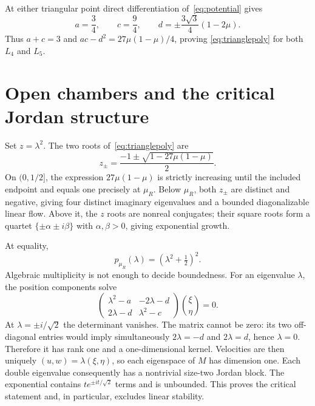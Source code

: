 \documentclass[10pt]{article}
\begin{document}
At either triangular point direct differentiation of~\eqref{eq:potential}
gives
\begin{equation}\label{eq:trihess}
 a=\frac34,\qquad c=\frac94,\qquad
 d=\mathord\pm\frac{3\sqrt3}{4}(1-2\mu).
\end{equation}
Thus $a+c=3$ and $ac-d^2=27\mu(1-\mu)/4$, proving
\eqref{eq:trianglepoly} for both $L_4$ and $L_5$.

\section{Open chambers and the critical Jordan structure}
Set $z=\lambda^2$.  The two roots of~\eqref{eq:trianglepoly} are
\begin{equation}\label{eq:zroots}
 z_\pm=\frac{-1\pm\sqrt{1-27\mu(1-\mu)}}{2}.
\end{equation}
On $(0,1/2]$, the expression $27\mu(1-\mu)$ is strictly increasing until
the included endpoint and equals one precisely at $\mu_R$.  Below $\mu_R$,
both $z_\pm$ are distinct and negative, giving four distinct imaginary
eigenvalues and a bounded diagonalizable linear flow.  Above it, the $z$
roots are nonreal conjugates; their square roots form a quartet
$\{\pm\alpha\pm i\beta\}$ with $\alpha,\beta>0$, giving exponential growth.

At equality,
\begin{equation}\label{eq:criticalpoly}
 p_{\mu_R}(\lambda)=(\lambda^2+\tfrac12)^2.
\end{equation}
Algebraic multiplicity is not enough to decide boundedness.  For an
eigenvalue $\lambda$, the position components solve
\begin{equation}\label{eq:pencil}
 \begin{pmatrix}
 \lambda^2-a&-2\lambda-d\\2\lambda-d&\lambda^2-c
 \end{pmatrix}\binom{\xi}{\eta}=0.
\end{equation}
At $\lambda=\pm i/\sqrt2$ the determinant vanishes.  The matrix cannot be
zero: its two off-diagonal entries would imply simultaneously
$2\lambda=-d$ and $2\lambda=d$, hence $\lambda=0$.  Therefore it has rank
one and a one-dimensional kernel.  Velocities are then uniquely
$(u,w)=\lambda(\xi,\eta)$, so each eigenspace of $M$ has dimension one.
Each double eigenvalue consequently has a nontrivial size-two Jordan block.
The exponential contains $t e^{\pm it/\sqrt2}$ terms and is unbounded.  This
proves the critical statement and, in particular, excludes linear stability.
\end{document}
